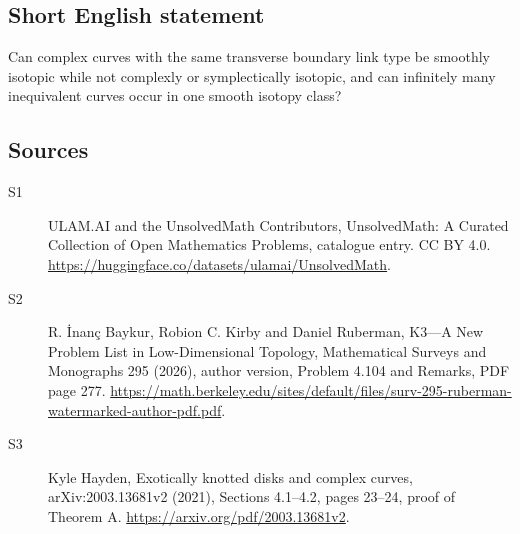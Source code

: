 \documentclass[11pt]{article}
\begin{document}
\subsection{Short English statement}
Can complex curves with the same transverse boundary link type be smoothly isotopic while not complexly or symplectically isotopic, and can infinitely many inequivalent curves occur in one smooth isotopy class?
\subsection{Sources}
\begin{description}
\item[\hypertarget{source:statement:1}{S1}] ULAM.AI and the UnsolvedMath Contributors, UnsolvedMath: A Curated Collection of Open Mathematics Problems, catalogue entry. CC BY 4.0. \url{https://huggingface.co/datasets/ulamai/UnsolvedMath}.
\item[\hypertarget{source:statement:2}{S2}] R. İnanç Baykur, Robion C. Kirby and Daniel Ruberman, K3—A New Problem List in Low-Dimensional Topology, Mathematical Surveys and Monographs 295 (2026), author version, Problem 4.104 and Remarks, PDF page 277. \url{https://math.berkeley.edu/sites/default/files/surv-295-ruberman-watermarked-author-pdf.pdf}.
\item[\hypertarget{source:statement:3}{S3}] Kyle Hayden, Exotically knotted disks and complex curves, arXiv:2003.13681v2 (2021), Sections 4.1--4.2, pages 23--24, proof of Theorem A. \url{https://arxiv.org/pdf/2003.13681v2}.
\end{description}
\label{end:statement}
\end{document}

